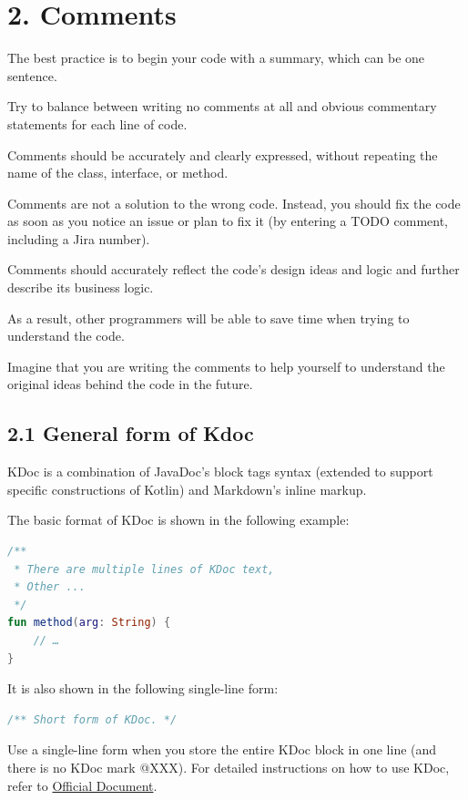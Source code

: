 \section*{\textbf{2. Comments}}



The best practice is to begin your code with a summary, which can be one sentence.

Try to balance between writing no comments at all and obvious commentary statements for each line of code.

Comments should be accurately and clearly expressed, without repeating the name of the class, interface, or method.

Comments are not a solution to the wrong code. Instead, you should fix the code as soon as you notice an issue or plan to fix it (by entering a TODO comment, including a Jira number).

Comments should accurately reflect the code's design ideas and logic and further describe its business logic.

As a result, other programmers will be able to save time when trying to understand the code.

Imagine that you are writing the comments to help yourself to understand the original ideas behind the code in the future. 



\subsection*{\textbf{2.1 General form of Kdoc}}



KDoc is a combination of JavaDoc's block tags syntax (extended to support specific constructions of Kotlin) and Markdown's inline markup.

The basic format of KDoc is shown in the following example:



\begin{lstlisting}[language=Kotlin]
 /**
 * There are multiple lines of KDoc text,
 * Other ...
 */
fun method(arg: String) {
    // …
}
\end{lstlisting}


It is also shown in the following single-line form:



\begin{lstlisting}[language=Kotlin]
 /** Short form of KDoc. */
\end{lstlisting}
Use a single-line form when you store the entire KDoc block in one line (and there is no KDoc mark @XXX). For detailed instructions on how to use KDoc, refer to \href{https://docs.oracle.com/en/Kotlin/Kotlinse/11/tools/KDoc.html}{Official Document}.




